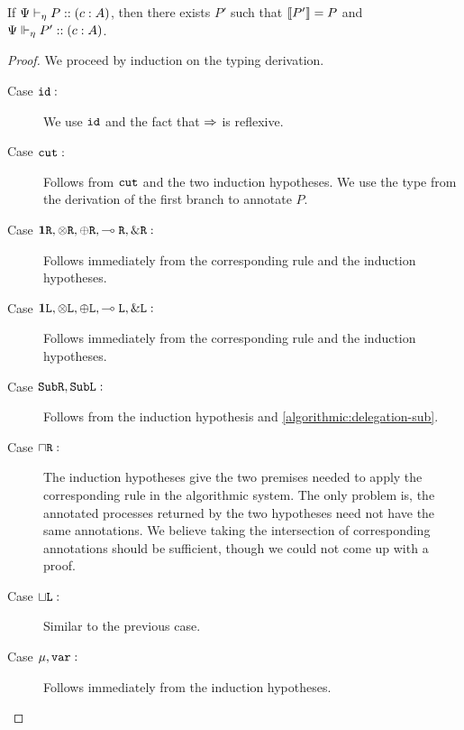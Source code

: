 

\begin{theorem}
  If ${\Psi} \vdash_{\eta} P :: (c : A)$, then there exists $P'$ such that $\llbracket P'\rrbracket = P$ and ${\Psi} \Vdash_{\eta} P' :: (c : A)$.
\end{theorem}
\begin{proof}
  We proceed by induction on the typing derivation.
  \begin{description}
    \item[Case $\texttt{id} :$] We use $\texttt{id}$ and the fact that $\mathrel\Rightarrow$ is reflexive.
    \item[Case $\texttt{cut} :$] Follows from $\texttt{cut}$ and the two induction hypotheses. We use the type from the derivation of the first branch to annotate $P$.

    \item[Case $\mathbf{1}\texttt{R}, \otimes\texttt{R}, \oplus\texttt{R}, \multimap\texttt{R}, \&\texttt{R} :$] Follows immediately from the corresponding rule and the induction hypotheses.
    \item[Case $\mathbf{1}\texttt{L}, \otimes\texttt{L}, \oplus\texttt{L}, \multimap\texttt{L}, \&\texttt{L} :$] Follows immediately from the corresponding rule and the induction hypotheses.

    \item[Case $\texttt{Sub}\texttt{R}, \texttt{Sub}\texttt{L} :$] Follows from the induction hypothesis and \cref{algorithmic:delegation-sub}.

    \item[Case $\mathbin{\sqcap}\texttt{R} :$] The induction hypotheses give the two premises needed to apply the corresponding rule in the algorithmic system. The only problem is, the annotated processes returned by the two hypotheses need not have the same annotations. We believe taking the intersection of corresponding annotations should be sufficient, though we could not come up with a proof. 
    \item[Case $\mathbin{\sqcup}\texttt{L} :$] Similar to the previous case. 

    \item[Case $\mu, \texttt{var} :$] Follows immediately from the induction hypotheses.
  \end{description}
\end{proof}

